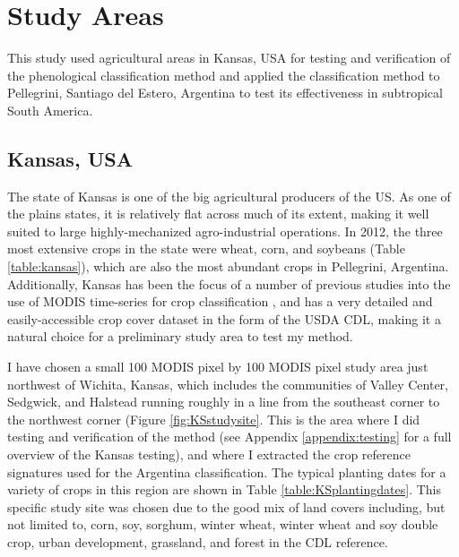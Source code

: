 \chapter{Study Areas}

This study used agricultural areas in Kansas, USA for testing and verification of the phenological classification method and applied the classification method to Pellegrini, Santiago del Estero, Argentina to test its effectiveness in subtropical South America.

\section{Kansas, USA}

The state of Kansas is one of the big agricultural producers of the US. As one of the plains states, it is relatively flat across much of its extent, making it well suited to large highly-mechanized agro-industrial operations. In 2012, the three most extensive crops in the state were wheat, corn, and soybeans (Table \ref{table:kansas}), which are also the most abundant crops in Pellegrini, Argentina. Additionally, Kansas has been the focus of a number of previous studies into the use of MODIS time-series for crop classification \autocites{wardlow2002discriminating}{wardlow2005state-level}{wardlow2007analysis}{wardlow2008large-area}, and has a very detailed and easily-accessible crop cover dataset in the form of the USDA CDL, making it a natural choice for a preliminary study area to test my method.

I have chosen a small 100 MODIS pixel by 100 MODIS pixel study area just northwest of Wichita, Kansas, which includes the communities of Valley Center, Sedgwick, and Halstead running roughly in a line from the southeast corner to the northwest corner (Figure \ref{fig:KSstudysite}. This is the area where I did testing and verification of the method (see Appendix \ref{appendix:testing} for a full overview of the Kansas testing), and where I extracted the crop reference signatures used for the Argentina classification. The typical planting dates for a variety of crops in this region are shown in Table \ref{table:KSplantingdates}. This specific study site was chosen due to the good mix of land covers including, but not limited to, corn, soy, sorghum, winter wheat, winter wheat and soy double crop, urban development, grassland, and forest in the CDL reference.


